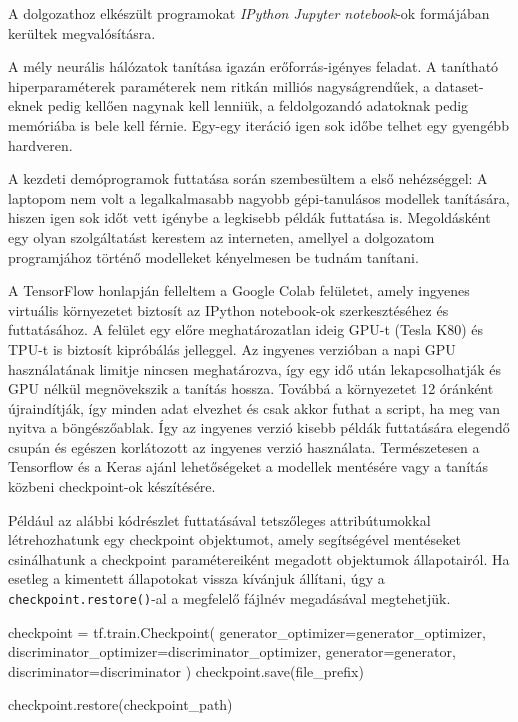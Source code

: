 A dolgozathoz elkészült programokat \textit{IPython Jupyter notebook}-ok \cite{jupyter} formájában kerültek megvalósításra.



A mély neurális hálózatok tanítása igazán erőforrás-igényes feladat. A tanítható hiperparaméterek paraméterek nem ritkán milliós nagyságrendűek, a dataset-eknek pedig kellően nagynak kell lenniük, a feldolgozandó adatoknak pedig memóriába is bele kell férnie. Egy-egy iteráció igen sok időbe telhet egy gyengébb hardveren.

A kezdeti demóprogramok futtatása során szembesültem a első nehézséggel: A laptopom nem volt a legalkalmasabb nagyobb gépi-tanulásos modellek tanítására, hiszen igen sok időt vett igénybe a legkisebb példák futtatása is. Megoldásként egy olyan szolgáltatást kerestem az interneten, amellyel a dolgozatom programjához történő modelleket kényelmesen be tudnám tanítani.

A TensorFlow honlapján felleltem a Google Colab \cite{colab} felületet, amely ingyenes virtuális környezetet biztosít az IPython notebook-ok szerkesztéséhez és futtatásához. A felület egy előre meghatározatlan ideig GPU-t (Tesla K80) és TPU-t is biztosít kipróbálás jelleggel. Az ingyenes verzióban a napi GPU használatának limitje nincsen meghatározva, így egy idő után lekapcsolhatják és GPU nélkül megnövekszik a tanítás hossza. Továbbá a környezetet 12 óránként újraindítják, így minden adat elvezhet és csak akkor futhat a script, ha meg van nyitva a böngészőablak. Így az ingyenes verzió kisebb példák futtatására elegendő csupán és egészen korlátozott az ingyenes verzió használata. Természetesen a Tensorflow és a Keras ajánl lehetőségeket a modellek mentésére vagy a tanítás közbeni checkpoint-ok készítésére.

Például az alábbi kódrészlet futtatásával tetszőleges attribútumokkal létrehozhatunk egy checkpoint objektumot, amely segítségével mentéseket csinálhatunk a checkpoint paramétereiként megadott objektumok állapotairól. Ha esetleg a kimentett állapotokat vissza kívánjuk állítani, úgy a \texttt{checkpoint.restore()}-al a megfelelő fájlnév megadásával megtehetjük.
\begin{python}
checkpoint = tf.train.Checkpoint(
    generator_optimizer=generator_optimizer,
    discriminator_optimizer=discriminator_optimizer,
    generator=generator,
    discriminator=discriminator
)
checkpoint.save(file_prefix)

checkpoint.restore(checkpoint_path)
\end{python}

